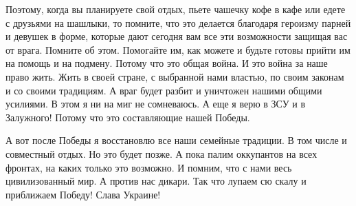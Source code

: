 Поэтому, когда вы планируете свой отдых, пьете чашечку кофе в кафе или едете с
друзьями на шашлыки, то помните, что это делается благодаря героизму парней и
девушек в форме, которые дают сегодня вам все эти возможности защищая вас от
врага. Помните об этом. Помогайте им, как можете и будьте готовы прийти им на
помощь и на подмену. Потому что это общая война. И это война за наше право
жить. Жить в своей стране, с выбранной нами властью, по своим законам и со
своими традициям. А враг будет разбит и уничтожен нашими общими усилиями. В
этом я ни на миг не сомневаюсь. А еще я верю в ЗСУ и в Залужного! Потому что
это составляющие нашей Победы.

А вот после Победы я восстановлю все наши семейные традиции. В том числе и
совместный отдых. Но это будет позже. А пока палим оккупантов на всех фронтах,
на каких только это возможно. И помним, что с нами весь цивилизованный мир. А
против нас дикари. Так что лупаем сю скалу и приближаем Победу! Слава Украине!
